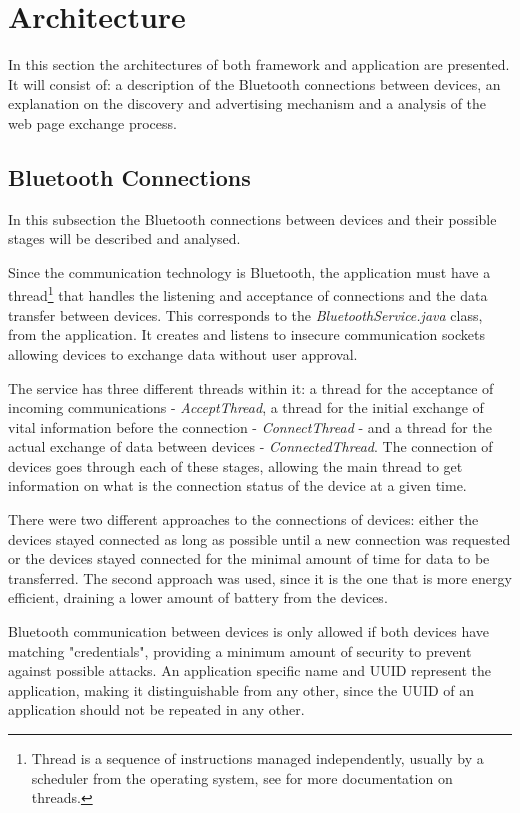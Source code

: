 \section{Architecture}
\label{sec:architecture}

In this section the architectures of both framework and application are presented. It will consist of: a description of the Bluetooth connections between devices, an explanation on the discovery and advertising mechanism and a analysis of the web page exchange process.

\subsection{Bluetooth Connections}
\label{subsec:btconn}

In this subsection the Bluetooth connections between devices and their possible stages will be described and analysed.

Since the communication technology is Bluetooth, the application must have a thread\footnote{Thread is a sequence of instructions managed independently, usually by a scheduler from the operating system, see \cite{threads} for more documentation on threads.} that handles the listening and acceptance of connections and the data transfer between devices. This corresponds to the \textit{BluetoothService.java} class, from the application. It creates and listens to insecure communication sockets allowing devices to exchange data without user approval.

The service has three different threads within it: a thread for the acceptance of incoming communications - \textit{AcceptThread}, a thread for the initial exchange of vital information before the connection - \textit{ConnectThread} - and a thread for the actual exchange of data between devices - \textit{ConnectedThread}. The connection of devices goes through each of these stages, allowing the main thread to get information on what is the connection status of the device at a given time.

There were two different approaches to the connections of devices: either the devices stayed connected as long as possible until a new connection was requested or the devices stayed connected for the minimal amount of time for data to be transferred. The second approach was used, since it is the one that is more energy efficient, draining a lower amount of battery from the devices.

Bluetooth communication between devices is only allowed if both devices have matching "credentials", providing a minimum amount of security to prevent against possible attacks. An application specific name and \gls{UUID} represent the application, making it distinguishable from any other, since the \gls{UUID} of an application should not be repeated in any other.

